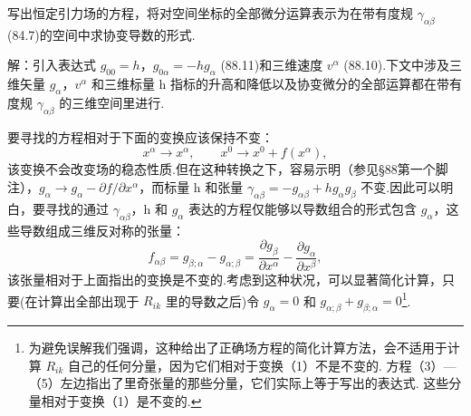 \begin{xiti}

\quad 写出恒定引力场的方程，将对空间坐标的全部微分运算表示为在带有度规 $\gamma_{\alpha\beta}$ (84.7)的空间中求协变导数的形式.

解：引入表达式 $g_{00}=h$，$g_{0\alpha}=-hg_{\alpha}$ (88.11)和三维速度 $v^{\alpha}$ (88.10).下文中涉及三维矢量 $g_{\alpha}$，$v^{\alpha}$ 和三维标量 h 指标的升高和降低以及协变微分的全部运算都在带有度规 $\gamma_{\alpha\beta}$ 的三维空间里进行.

要寻找的方程相对于下面的变换应该保持不变：
\begin{equation*}
  x^{\alpha}\to x^{\alpha},\qquad
  x^0\to x^0+f(x^{\alpha}),
\tag{1}\end{equation*}
该变换不会改变场的稳态性质.但在这种转换之下，容易示明（参见§88第一个脚注），$g_{\alpha}\to g_{\alpha}-\partial f/\partial x^{\alpha}$，而标量 h 和张量 $\gamma_{\alpha\beta}=-g_{\alpha\beta}+hg_{\alpha}g_{\beta}$ 不变.因此可以明白，要寻找的通过 $\gamma_{\alpha\beta}$，h 和 $g_{\alpha}$ 表达的方程仅能够以导数组合的形式包含 $g_{\alpha}$，这些导数组成三维反对称的张量：
\begin{equation*}
  f_{\alpha\beta}=g_{\beta;\alpha}-g_{\alpha;\beta}
  =\frac{\partial g_{\beta}}{\partial x^{\alpha}}
  -\frac{\partial g_{\alpha}}{\partial x^{\beta}},
\tag{2}\end{equation*}
该张量相对于上面指出的变换是不变的.考虑到这种状况，可以显著简化计算，只要(在计算出全部出现于 $R_{ik}$ 里的导数之后)令 $g_{\alpha}=0$ 和 $g_{\alpha;\beta}+g_{\beta;\alpha}=0$\footnote{为避免误解我们强调，这种给出了正确场方程的简化计算方法，会不适用于计算 $R_{ik}$ 自己的任何分量，因为它们相对于变换（1）不是不变的. 方程（3）—（5）左边指出了里奇张量的那些分量，它们实际上等于写出的表达式. 这些分量相对于变换（1）是不变的.}.


\end{xiti}
